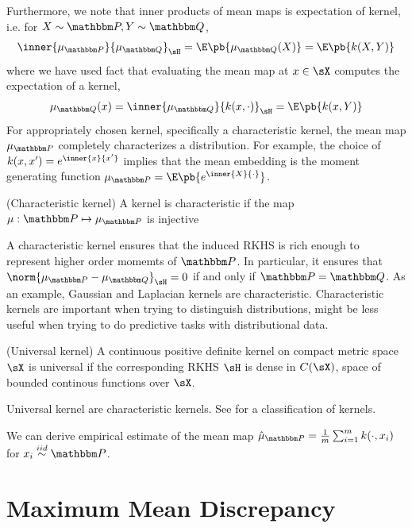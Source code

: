 \documentclass[11pt]{article}
\begin{document}
Furthermore, we note that inner products of mean maps is expectation of kernel, i.e. for $X\sim\bbP,Y\sim\bbQ$,
\begin{align}
    \inner{\mu_{\bbP}}{\mu_{\bbQ}}_{\sH}
        = \E\pb{\mu_{\bbQ}(X)}
        = \E\pb{ k(X,Y) }
\end{align}
where we have used fact that evaluating the mean map at $x\in\sX$ computes the expectation of a kernel,
\begin{align}
    \mu_{\bbQ}(x)
        = \inner{\mu_{\bbQ}}{k(x,\cdot)}_{\sH}
        = \E\pb{k(x,Y)}
\end{align}
For appropriately chosen kernel, specifically a characteristic kernel, the mean map $\mu_{\bbP}$ completely characterizes a distribution. For example, the choice of $k(x,x') = e^{\inner{x}{x'}}$ implies that the mean embedding is the moment generating function $\mu_{\bbP} = \E\pb{e^{\inner{X}{\cdot}}}$.

\begin{definition}
    (Characteristic kernel) A kernel is characteristic if the map $\mu:\bbP\mapsto \mu_{\bbP}$ is injective
\end{definition}

A characteristic kernel ensures that the induced RKHS is rich enough to represent higher order momemts of $\bbP$. In particular, it ensures that $\norm{\mu_{\bbP}-\mu_{\bbQ}}_{\sH} = 0$ if and only if $\bbP=\bbQ$. As an example, Gaussian and Laplacian kernels are characteristic. Characteristic kernels are important when trying to distinguish distributions, might be less useful when trying to do predictive tasks with distributional data.

\begin{definition}
    (Universal kernel) A continuous positive definite kernel on compact metric space $\sX$ is universal if the corresponding RKHS $\sH$ is dense in $C(\sX)$, space of bounded continous functions over $\sX$.
\end{definition}

Universal kernel are characteristic kernels. See \cite{muandetKernelMeanEmbedding2017} for a classification of kernels.

We can derive empirical estimate of the mean map $\hat{\mu}_{\bbP} = \frac{1}{m}\sum_{i=1}^m k(\cdot,x_i)$ for $x_i \overset{iid}{\sim} \bbP$. 


\section{Maximum Mean Discrepancy}
\end{document}
